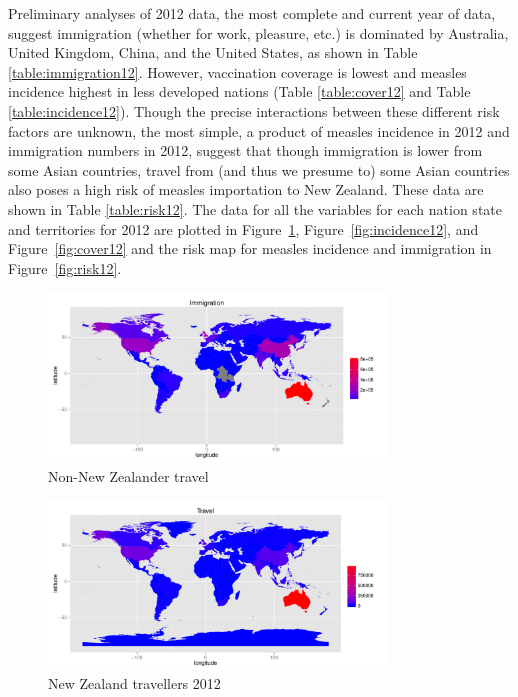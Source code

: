 \documentclass{article}
\begin{document}
Preliminary analyses of 2012 data, the most complete and current year of data, suggest immigration (whether for work, pleasure, etc.) is dominated by Australia, United Kingdom, China, and the United States, as shown in Table \ref{table:immigration12}. However, vaccination coverage is lowest and measles incidence highest in less developed nations (Table \ref{table:cover12} and Table \ref{table:incidence12}). Though the precise interactions between these different risk factors are unknown, the most simple, a product of measles incidence in 2012 and immigration numbers in 2012, suggest that though immigration is lower from some Asian countries, travel from (and thus we presume to) some Asian countries also poses a high risk of measles importation to New Zealand. These data are shown in Table \ref{table:risk12}. The data for all the variables for each nation state and territories for 2012 are plotted in Figure~\ref{fig:immigration12}, Figure~\ref{fig:incidence12}, and Figure~\ref{fig:cover12} and the risk map for measles incidence and immigration in Figure~\ref{fig:risk12}.


\begin{figure}
     \centering
     \includegraphics[width=0.8\textwidth]{np1.pdf}
     \caption{Non-New Zealander travel}
     \label{fig:immigration12}
\end{figure}

\begin{figure}
     \centering
     \includegraphics[width=0.8\textwidth]{nznp1.pdf}
     \caption{New Zealand travellers 2012}
     \label{fig:nztravellers}
\end{figure}
\end{document}
